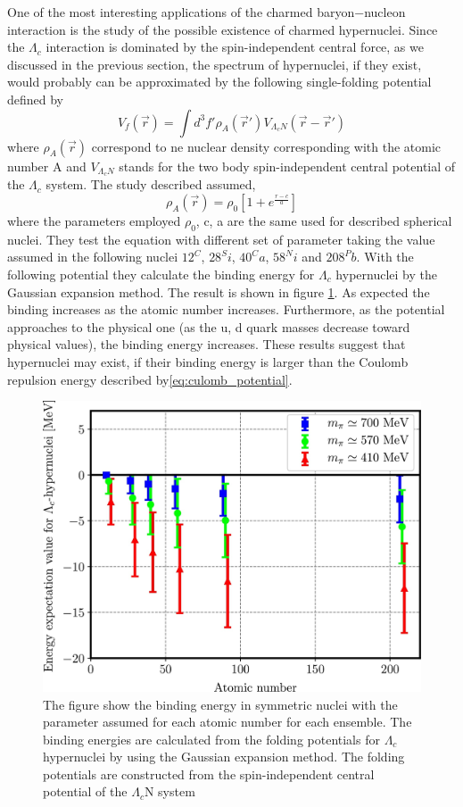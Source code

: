 \documentclass[12pt,a4paper]{book}
\begin{document}
	One of the most interesting applications of the charmed baryon−nucleon interaction is the study of the possible existence of charmed hypernuclei. Since the $\Lambda_c$ interaction is dominated by the spin-independent central force, as we discussed in the previous section, the spectrum of hypernuclei, if they exist, would probably can be approximated by the following single-folding potential defined by
	\begin{equation}
		V_f(\vec{r}) = \int d^3f' \rho_A (\vec{r}') V_{\Lambda_cN} (\vec{r}- \vec{r}') 
	\end{equation}
	where $\rho_A(\vec{r})$ correspond to ne nuclear density corresponding with the atomic number A and $V_{\Lambda_cN}$ stands for the two body spin-independent central potential of the $\Lambda_c$ system. The study described assumed,
	\begin{equation}
		\rho_A(\vec{r})=\rho_0 \left[1+ e^{\frac{r-c}{a}}\right]
	\end{equation}
	where the parameters employed $\rho_0$, c, a are the same used for described spherical nuclei. They test the equation with different set of parameter taking the value assumed in the following nuclei ${12}^C$, ${28}^Si$, ${40}^Ca$, ${58}^Ni$ and ${208}^Pb$.
	With the following potential they calculate the binding energy for $\Lambda_c$ hypernuclei by the Gaussian expansion method. The result is shown in figure \ref{fig:binding_energy}. As expected the binding increases as the atomic number increases. Furthermore, as the potential approaches to the physical one (as the u, d quark masses decrease toward physical values), the binding energy increases. These results suggest that hypernuclei may exist, if their binding energy is larger than the Coulomb repulsion energy described by\ref{eq:culomb_potential}.
	
	\begin{figure}
		\centering
		\includegraphics[width=0.74 \linewidth]{pictures/binding_energy.jpg}
		\caption{ The figure show the binding energy in symmetric nuclei with the parameter assumed for each atomic number for each ensemble. The binding energies are calculated from the folding potentials for $\Lambda_c$ hypernuclei by using the Gaussian expansion method. The folding potentials are constructed from the spin-independent central potential of the $\Lambda_c$N system}
		\label{fig:binding_energy}
	\end{figure}
	
\end{document}
